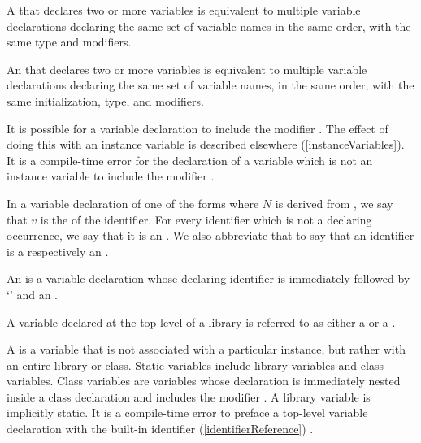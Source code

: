 \documentclass[makeidx]{article}
\begin{document}
\LMHash{}%
A  that declares two or more variables
is equivalent to multiple variable declarations declaring
the same set of variable names in the same order,
with the same type and modifiers.

\LMHash{}%
An 
that declares two or more variables
is equivalent to multiple variable declarations declaring
the same set of variable names, in the same order,
with the same initialization, type, and modifiers.


\LMHash{}%
It is possible for a variable declaration to include the modifier \COVARIANT{}.
The effect of doing this with an instance variable is described elsewhere
(\ref{instanceVariables}).
It is a compile-time error for the declaration of
a variable which is not an instance variable
to include the modifier \COVARIANT{}.

\LMHash{}%
In a variable declaration of one of the forms
where $N$ is derived from
,
we say that $v$ is the  of the identifier.
For every identifier which is not a declaring occurrence,
we say that it is an .
We also abbreviate that to say that an identifier is
a  respectively an .


\LMHash{}%
An 
is a variable declaration whose declaring identifier is
immediately followed by `\code{=}' and an .

\LMHash{}%
A variable declared at the top-level of a library is referred to as either a
 or a
.

\LMHash{}%
A 
is a variable that is not associated with a particular instance,
but rather with an entire library or class.
Static variables include library variables and class variables.
Class variables are variables whose declaration is immediately nested inside a class declaration and includes the modifier \STATIC{}.
A library variable is implicitly static.
It is a compile-time error to preface a top-level variable declaration with the built-in identifier (\ref{identifierReference}) \STATIC{}.
\end{document}
